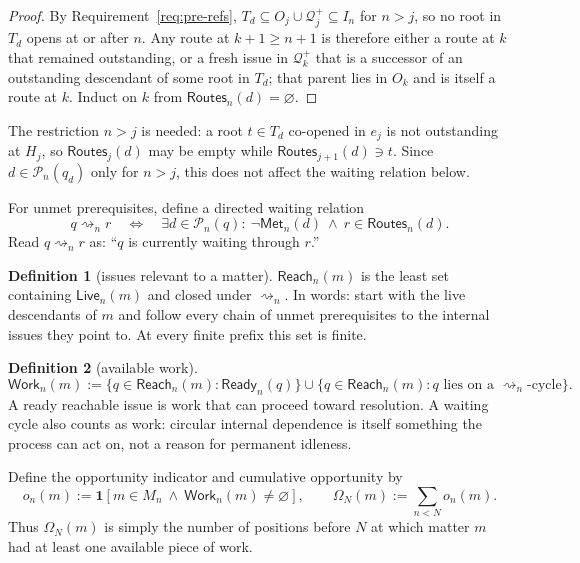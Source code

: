 \documentclass[11pt]{article}
\theoremstyle{definition}
\newtheorem*{definition}{Definition}
\theoremstyle{remark}
\newcommand{\Met}{\mathsf{Met}}
\newcommand{\Pre}{\mathcal P}
\newcommand{\Ready}{\mathsf{Ready}}
\newcommand{\Live}{\mathsf{Live}}
\newcommand{\Routes}{\mathsf{Routes}}
\newcommand{\Reach}{\mathsf{Reach}}
\newcommand{\Work}{\mathsf{Work}}
\newcommand{\Born}{\mathcal Q^{+}}
\newcommand{\ind}[1]{\mathbf 1[#1]}
\begin{document}
\begin{proof}
By Requirement~\ref{req:pre-refs}, $T_d\subseteq O_j\cup\Born_j\subseteq I_n$
for $n>j$, so no root in $T_d$ opens at or after $n$. Any route at $k+1\ge n+1$
is therefore either a route at $k$ that remained outstanding, or a fresh issue
in $\Born_k$ that is a successor of an outstanding descendant of some root in
$T_d$; that parent lies in $O_k$ and is itself a route at $k$. Induct on $k$
from $\Routes_n(d)=\varnothing$.
\end{proof}

The restriction $n>j$ is needed: a root $t\in T_d$ co-opened in $e_j$ is not
outstanding at $H_j$, so $\Routes_j(d)$ may be empty while
$\Routes_{j+1}(d)\ni t$. Since $d\in\Pre_n(q_d)$ only for $n>j$, this does not
affect the waiting relation below.

For unmet prerequisites, define a directed waiting relation
\[
 q\rightsquigarrow_n r
 \quad\Longleftrightarrow\quad
 \exists d\in\Pre_n(q):\ \neg\Met_n(d)\ \wedge\ r\in\Routes_n(d).
\]
Read $q\rightsquigarrow_n r$ as: ``$q$ is currently waiting through $r$.''

\begin{definition}[issues relevant to a matter]
$\Reach_n(m)$ is the least set containing $\Live_n(m)$ and closed under
$\rightsquigarrow_n$. In words: start with the live descendants of $m$ and
follow every chain of unmet prerequisites to the internal issues they point to.
At every finite prefix this set is finite.
\end{definition}

\begin{definition}[available work]
\[
 \Work_n(m)
 :=\{q\in\Reach_n(m):\Ready_n(q)\}
 \cup
 \{q\in\Reach_n(m):q\text{ lies on a }\rightsquigarrow_n\text{-cycle}\}.
\]
A ready reachable issue is work that can proceed toward resolution. A waiting
cycle also counts as work: circular internal dependence is itself something
the process can act on, not a reason for permanent idleness.
\end{definition}

Define the opportunity indicator and cumulative opportunity by
\[
 o_n(m):=\ind{m\in M_n\ \wedge\ \Work_n(m)\neq\varnothing},
 \qquad
 \Omega_N(m):=\sum_{n<N}o_n(m).
\]
Thus $\Omega_N(m)$ is simply the number of positions before $N$ at which
matter $m$ had at least one available piece of work.
\end{document}
